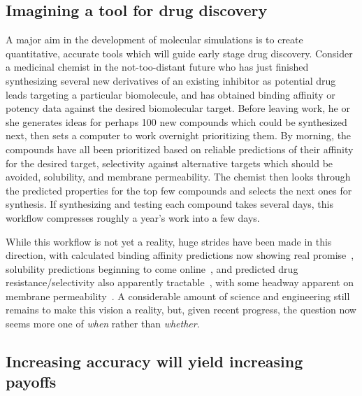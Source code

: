 \documentclass[aps,pre,twocolumn,nofootinbib,superscriptaddress,10pt, final,tightenlines]{revtex4-1}
\begin{document}
\subsection{Imagining a tool for drug discovery}
A major aim in the development of molecular simulations is to create quantitative, accurate tools which will guide early stage drug discovery. 
Consider a medicinal chemist in the not-too-distant future who has just finished synthesizing several new derivatives of an existing inhibitor as potential drug leads targeting a particular biomolecule, and has obtained binding affinity or potency data against the desired biomolecular target. 
Before leaving work, he or she generates ideas for perhaps 100 new compounds which could be synthesized next, then sets a computer to work overnight prioritizing them. 
By morning, the compounds have all been prioritized based on reliable predictions of their affinity for the desired target, selectivity against alternative targets which should be avoided, solubility, and membrane permeability.  
The chemist then looks through the predicted properties for the top few compounds and selects the next ones for synthesis. 
If synthesizing and testing each compound takes several days, this workflow compresses roughly a year's work into a few days.


While this workflow is not yet a reality, huge strides have been made in this direction, with calculated binding affinity predictions now showing real promise~\cite{mobley_perspective_2012, christ_accuracy_2014, deng_distinguishing_2015, sherborne_preprint_2016, schrodinger_accurate_2015, christ_binding_2016, cui_affinity_2016, verras_free_2016}, solubility predictions beginning to come online~\cite{Schnieders:2012:J.Chem.TheoryComput., park_absolute_2014, liu_using_2016}, and predicted drug resistance/selectivity also apparently tractable~\cite{leonis_contribution_2013, leonis_contribution_2013}, with some headway apparent on membrane permeability~\cite{lee_permeability_2016, comer_permeability_2014}. 
A considerable amount of science and engineering still remains to make this vision a reality, but, given recent progress, the question now seems more one of \emph{when} rather than \emph{whether}. 

\subsection{Increasing accuracy will yield increasing payoffs}
\end{document}
